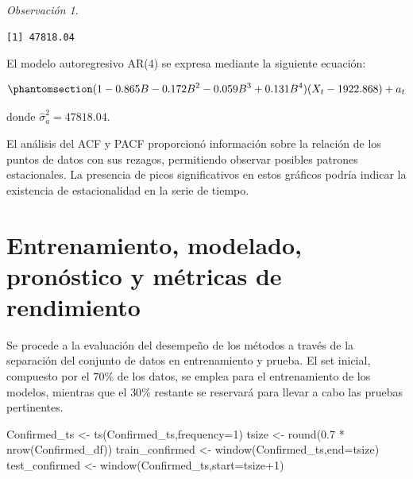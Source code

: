\documentclass[
  letterpaper,
  DIV=11,
  numbers=noendperiod]{scrreport}
\newenvironment{Shaded}{\begin{snugshade}}{\end{snugshade}}
\newcommand{\AttributeTok}[1]{\textcolor[rgb]{0.40,0.45,0.13}{#1}}
\newcommand{\CommentTok}[1]{\textcolor[rgb]{0.37,0.37,0.37}{#1}}
\newcommand{\DecValTok}[1]{\textcolor[rgb]{0.68,0.00,0.00}{#1}}
\newcommand{\FloatTok}[1]{\textcolor[rgb]{0.68,0.00,0.00}{#1}}
\newcommand{\FunctionTok}[1]{\textcolor[rgb]{0.28,0.35,0.67}{#1}}
\newcommand{\NormalTok}[1]{\textcolor[rgb]{0.00,0.23,0.31}{#1}}
\newcommand{\OtherTok}[1]{\textcolor[rgb]{0.00,0.23,0.31}{#1}}
\newcommand{\SpecialCharTok}[1]{\textcolor[rgb]{0.37,0.37,0.37}{#1}}
\theoremstyle{plain}
\theoremstyle{definition}
\theoremstyle{definition}
\theoremstyle{plain}
\theoremstyle{remark}
\newtheorem*{remark}{Observación}
\begin{document}
\begin{remark}
\begin{Shaded}
\end{Shaded}

\begin{verbatim}
[1] 47818.04
\end{verbatim}

El modelo autoregresivo AR(4) se expresa mediante la siguiente ecuación:

\begin{equation}\phantomsection\label{eq-AR4}{
(1-0.865B-0.172B^2-0.059B^3+0.131B^4)(X_t-1922.868)+a_t
}\end{equation}

donde \(\hat{\sigma}_a^2 = 47818.04\).
\end{remark}

El análisis del ACF y PACF proporcionó información sobre la relación de
los puntos de datos con sus rezagos, permitiendo observar posibles
patrones estacionales. La presencia de picos significativos en estos
gráficos podría indicar la existencia de estacionalidad en la serie de
tiempo.

\section{Entrenamiento, modelado, pronóstico y métricas de
rendimiento}\label{entrenamiento-modelado-pronuxf3stico-y-muxe9tricas-de-rendimiento}

Se procede a la evaluación del desempeño de los métodos a través de la
separación del conjunto de datos en entrenamiento y prueba. El set
inicial, compuesto por el \(70\%\) de los datos, se emplea para el
entrenamiento de los modelos, mientras que el \(30\%\) restante se
reservará para llevar a cabo las pruebas pertinentes.

\begin{Shaded}
\begin{Highlighting}[]
\NormalTok{Confirmed\_ts }\OtherTok{\textless{}{-}} \FunctionTok{ts}\NormalTok{(Confirmed\_ts,}\AttributeTok{frequency=}\DecValTok{1}\NormalTok{)}
\NormalTok{tsize }\OtherTok{\textless{}{-}} \FunctionTok{round}\NormalTok{(}\FloatTok{0.7} \SpecialCharTok{*} \FunctionTok{nrow}\NormalTok{(Confirmed\_df))}
\NormalTok{train\_confirmed }\OtherTok{\textless{}{-}} \FunctionTok{window}\NormalTok{(Confirmed\_ts,}\AttributeTok{end=}\NormalTok{tsize)}
\NormalTok{test\_confirmed }\OtherTok{\textless{}{-}} \FunctionTok{window}\NormalTok{(Confirmed\_ts,}\AttributeTok{start=}\NormalTok{tsize}\SpecialCharTok{+}\DecValTok{1}\NormalTok{)}
\end{Highlighting}
\end{Shaded}
\end{document}
